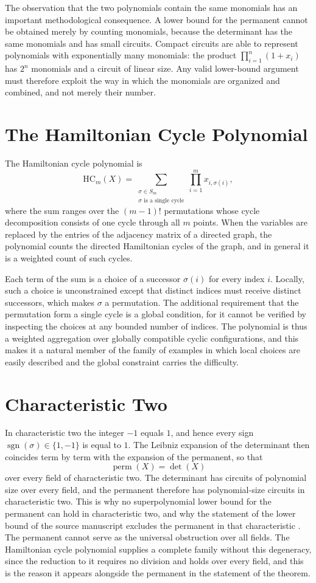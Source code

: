\documentclass[11pt,letterpaper]{report}
\theoremstyle{plain}
\theoremstyle{definition}
\theoremstyle{remark}
\DeclareMathOperator{\sgn}{sgn}
\DeclareMathOperator{\perm}{perm}
\begin{document}
The observation that the two polynomials contain the same monomials has an important methodological consequence. A lower bound for the permanent cannot be obtained merely by counting monomials, because the determinant has the same monomials and has small circuits. Compact circuits are able to represent polynomials with exponentially many monomials: the product $\prod_{i=1}^{n}(1+x_i)$ has $2^n$ monomials and a circuit of linear size. Any valid lower-bound argument must therefore exploit the way in which the monomials are organized and combined, and not merely their number.

\section{The Hamiltonian Cycle Polynomial}

The Hamiltonian cycle polynomial is
\[
\mathrm{HC}_m(X)=
\sum_{\substack{\sigma\in S_m\\
\sigma\text{ is a single cycle}}}
\prod_{i=1}^{m}x_{i,\sigma(i)},
\]
where the sum ranges over the $(m-1)!$ permutations whose cycle decomposition consists of one cycle through all $m$ points. When the variables are replaced by the entries of the adjacency matrix of a directed graph, the polynomial counts the directed Hamiltonian cycles of the graph, and in general it is a weighted count of such cycles.

Each term of the sum is a choice of a successor $\sigma(i)$ for every index $i$. Locally, such a choice is unconstrained except that distinct indices must receive distinct successors, which makes $\sigma$ a permutation. The additional requirement that the permutation form a single cycle is a global condition, for it cannot be verified by inspecting the choices at any bounded number of indices. The polynomial is thus a weighted aggregation over globally compatible cyclic configurations, and this makes it a natural member of the family of examples in which local choices are easily described and the global constraint carries the difficulty.

\section{Characteristic Two}

In characteristic two the integer $-1$ equals $1$, and hence every sign $\sgn(\sigma)\in\{1,-1\}$ is equal to $1$. The Leibniz expansion of the determinant then coincides term by term with the expansion of the permanent, so that
\[
\perm(X)=\det(X)
\]
over every field of characteristic two. The determinant has circuits of polynomial size over every field, and the permanent therefore has polynomial-size circuits in characteristic two. This is why no superpolynomial lower bound for the permanent can hold in characteristic two, and why the statement of the lower bound of the source manuscript excludes the permanent in that characteristic \cite{Source2026}. The permanent cannot serve as the universal obstruction over all fields. The Hamiltonian cycle polynomial supplies a complete family without this degeneracy, since the reduction to it requires no division and holds over every field, and this is the reason it appears alongside the permanent in the statement of the theorem.
\end{document}

